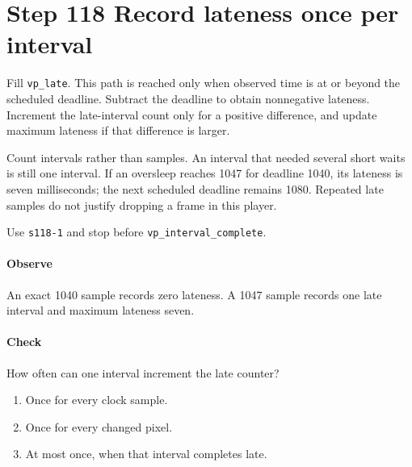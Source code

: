 \section{Step 118 Record lateness once per interval}
Fill \texttt{vp\_late}. This path is reached only when observed time is at or beyond the scheduled deadline. Subtract the deadline to obtain nonnegative lateness. Increment the late-interval count only for a positive difference, and update maximum lateness if that difference is larger.

Count intervals rather than samples. An interval that needed several short waits is still one interval. If an oversleep reaches 1047 for deadline 1040, its lateness is seven milliseconds; the next scheduled deadline remains 1080. Repeated late samples do not justify dropping a frame in this player.

Use \texttt{s118-1} and stop before \texttt{vp\_interval\_complete}.

\paragraph{Observe} An exact 1040 sample records zero lateness. A 1047 sample records one late interval and maximum lateness seven.

\paragraph{Check} How often can one interval increment the late counter?
\begin{enumerate}[label=\Alph*.]
  \item Once for every clock sample.
  \item Once for every changed pixel.
  \item At most once, when that interval completes late.
\end{enumerate}
